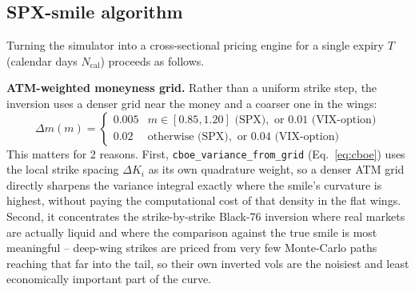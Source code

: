 \documentclass[11pt]{article}
\begin{document}
\subsection{SPX-smile algorithm}
\label{sec:spx-algo}
Turning the simulator into a cross-sectional pricing engine for a
single expiry $T$ (calendar days $N_{\text{cal}}$) proceeds as follows.

\begin{note}
\textbf{ATM-weighted moneyness grid.} Rather than a uniform strike
step, the inversion uses a denser grid near the money and a coarser
one in the wings:
\begin{equation}
\Delta m(m) = \begin{cases}
0.005 & m\in[0.85,1.20] \text{ (SPX)}, \text{ or } 0.01 \text{ (VIX-option)} \\
0.02 & \text{otherwise (SPX)}, \text{ or } 0.04 \text{ (VIX-option)}
\end{cases}
\label{eq:grid}
\end{equation}
This matters for 2 reasons. First, \texttt{cboe\_variance\_from\_grid}
(Eq.~\eqref{eq:cboe}) uses the local strike spacing $\Delta K_i$ as its
own quadrature weight, so a denser ATM grid directly sharpens the
variance integral exactly where the smile's curvature is highest,
without paying the computational cost of that density in the flat
wings. Second, it concentrates the strike-by-strike Black-76 inversion
where real markets are actually liquid and where the comparison
against the true smile is most meaningful -- deep-wing strikes are
priced from very few Monte-Carlo paths reaching that far into the
tail, so their own inverted vols are the noisiest and least
economically important part of the curve.
\end{note}
\end{document}
